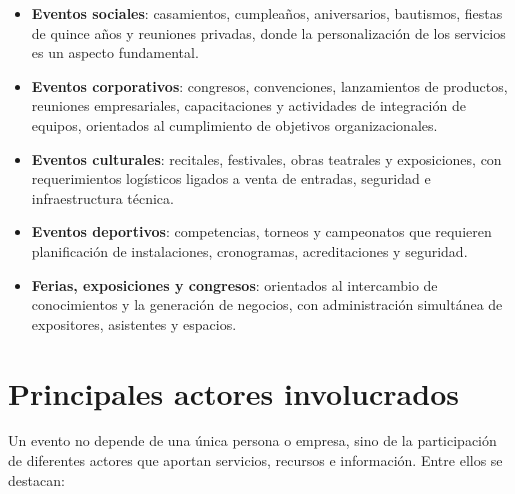 \begin{itemize}
    \item \textbf{Eventos sociales}: casamientos, cumpleaños,
          aniversarios, bautismos, fiestas de quince años y reuniones
          privadas, donde la personalización de los servicios es un
          aspecto fundamental.
    \item \textbf{Eventos corporativos}: congresos, convenciones,
          lanzamientos de productos, reuniones empresariales,
          capacitaciones y actividades de integración de equipos,
          orientados al cumplimiento de objetivos organizacionales.
    \item \textbf{Eventos culturales}: recitales, festivales, obras
          teatrales y exposiciones, con requerimientos logísticos ligados
          a venta de entradas, seguridad e infraestructura técnica.
    \item \textbf{Eventos deportivos}: competencias, torneos y
          campeonatos que requieren planificación de instalaciones,
          cronogramas, acreditaciones y seguridad.
    \item \textbf{Ferias, exposiciones y congresos}: orientados al
          intercambio de conocimientos y la generación de negocios, con
          administración simultánea de expositores, asistentes y
          espacios.
\end{itemize}

\section{Principales actores involucrados}

Un evento no depende de una única persona o empresa, sino de la
participación de diferentes actores que aportan servicios, recursos e
información. Entre ellos se destacan:

